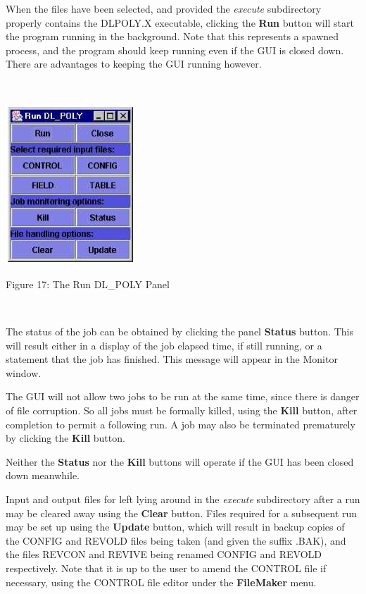 When the files have been selected, and provided the {\em execute}
subdirectory properly contains the DLPOLY.X executable, clicking the {\bf
Run} button will start the \DD{} program running in the background. Note
that this represents a spawned process, and the program should keep
running even if the GUI is closed down. There are advantages to keeping
the GUI running however.

~

\vskip 5mm
\centerline{\includegraphics[height=6cm]{execute.ps}}
\centerline{Figure 17: The Run DL\_POLY Panel}
\vskip 5mm

~

\noindent

The status of the job can be obtained by clicking the panel {\bf
Status} button. This will result either in a display of the job
elapsed time, if still running, or a statement that the job has
finished. This message will appear in the Monitor window. 

The GUI will not allow two jobs to be run at the same time, since
there is danger of file corruption. So all jobs must be formally
killed, using the {\bf Kill} button, after completion to permit a
following run. A job may also be terminated prematurely by clicking
the {\bf Kill} button.

Neither the {\bf Status} nor the {\bf Kill} buttons will operate if
the GUI has been closed down meanwhile.

Input and output files for \DD{} left lying around in the {\em execute}
subdirectory after a run may be cleared away using the {\bf Clear}
button. Files required for a subsequent run may be set up using the
{\bf Update} button, which will result in backup copies of the CONFIG
and REVOLD files being taken (and given the suffix .BAK), and the
files REVCON and REVIVE being renamed CONFIG and REVOLD
respectively. Note that it is up to the user to amend the CONTROL file
if necessary, using the CONTROL file editor under the {\bf FileMaker}
menu.

